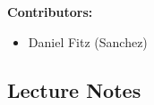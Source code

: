 \documentclass[12pt, a4paper]{report}
\begin{document}
	\tableofcontents
	\vspace{2em}
	\textbf{Contributors:}
	\begin{itemize}
		\item Daniel Fitz (Sanchez)
	\end{itemize}
	\newpage

\begin{multicols*}{2}

\chapter{Lecture Notes}





\end{multicols*}
\end{document}
